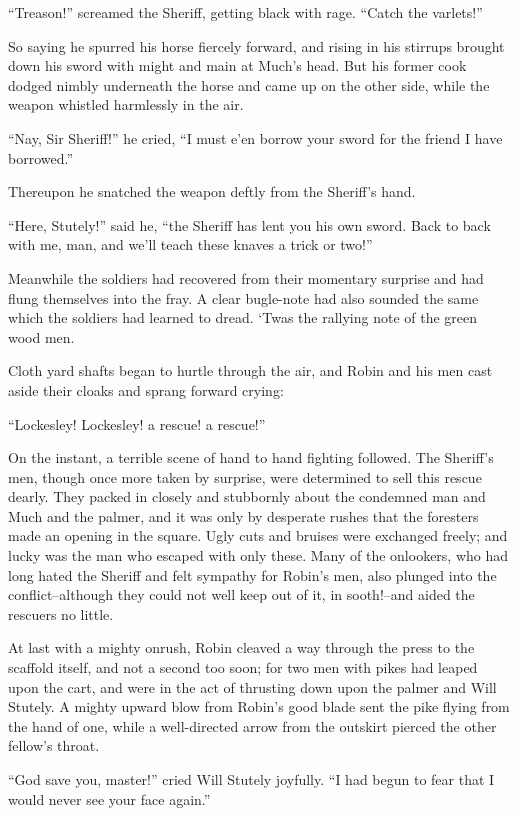 ``Treason!'' screamed the Sheriff, getting black with rage. ``Catch the
varlets!''

So saying he spurred his horse fiercely forward, and rising in his
stirrups brought down his sword with might and main at Much's head. But
his former cook dodged nimbly underneath the horse and came up on the
other side, while the weapon whistled harmlessly in the air.

``Nay, Sir Sheriff!'' he cried, ``I must e'en borrow your sword for the
friend I have borrowed.''

Thereupon he snatched the weapon deftly from the Sheriff's hand.

``Here, Stutely!'' said he, ``the Sheriff has lent you his own sword.
Back to back with me, man, and we'll teach these knaves a trick or
two!''

Meanwhile the soldiers had recovered from their momentary surprise and
had flung themselves into the fray. A clear bugle-note had also sounded
the same which the soldiers had learned to dread. `Twas the rallying
note of the green wood men.

Cloth yard shafts began to hurtle through the air, and Robin and his men
cast aside their cloaks and sprang forward crying:

``Lockesley! Lockesley! a rescue! a rescue!''

On the instant, a terrible scene of hand to hand fighting followed. The
Sheriff's men, though once more taken by surprise, were determined to
sell this rescue dearly. They packed in closely and stubbornly about the
condemned man and Much and the palmer, and it was only by desperate
rushes that the foresters made an opening in the square. Ugly cuts and
bruises were exchanged freely; and lucky was the man who escaped with
only these. Many of the onlookers, who had long hated the Sheriff and
felt sympathy for Robin's men, also plunged into the conflict--although
they could not well keep out of it, in sooth!--and aided the rescuers no
little.

At last with a mighty onrush, Robin cleaved a way through the press to
the scaffold itself, and not a second too soon; for two men with pikes
had leaped upon the cart, and were in the act of thrusting down upon the
palmer and Will Stutely. A mighty upward blow from Robin's good blade
sent the pike flying from the hand of one, while a well-directed arrow
from the outskirt pierced the other fellow's throat.

``God save you, master!'' cried Will Stutely joyfully. ``I had begun to
fear that I would never see your face again.''


